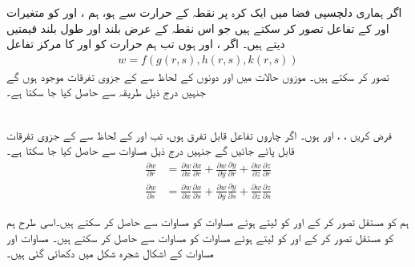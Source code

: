 اگر ہماری دلچسپی  فضا میں ایک کرہ  پر نقطہ   کے  حرارت سے ہو، ہم  ،  اور  کو  متغیرات  اور  کے تفاعل تصور کر سکتے ہیں جو  اس نقطہ کے عرض بلند اور  طول بلند قیمتیں دیتے ہیں۔ اگر ،  اور  ہوں  تب ہم حرارت کو  اور  کا  مرکز تفاعل
\begin{align*}
w=f(g(r,s),h(r,s),k(r,s))
\end{align*}
 تصور کر سکتے ہیں۔ موزوں حالات میں   اور  دونوں کے لحاظ سے  کے جزوی تفرقات موجود ہوں گے جنہیں درج ذیل طریقہ سے حاصل کیا جا سکتا ہے۔

\\
فرض کریں ، ،  اور  ہوں۔ اگر چاروں تفاعل قابل تفرق ہوں، تب  اور  کے لحاظ سے  کے جزوی تفرقات قابل  پائے جائیں گے جنہیں درج ذیل مساوات سے حاصل کیا جا سکتا ہے۔
\begin{align}
\frac{\partial w}{\partial r}&=\frac{\partial w}{\partial x}\frac{\partial x}{\partial r}+\frac{\partial w}{\partial y}\frac{\partial y}{\partial r}+\frac{\partial w}{\partial z}\frac{\partial z}{\partial r}\label{مساوات_کثیرالمتغیر_دو_غیر_تابع_تین_درمیانے_متغیر_الف}\\
\frac{\partial w}{\partial s}&=\frac{\partial w}{\partial x}\frac{\partial x}{\partial s}+\frac{\partial w}{\partial y}\frac{\partial y}{\partial s}+\frac{\partial w}{\partial z}\frac{\partial z}{\partial s}\label{مساوات_کثیرالمتغیر_دو_غیر_تابع_تین_درمیانے_متغیر_ب}
\end{align}

 ہم  کو مستقل  تصور کر کے  اور   کو لیتے  ہوئے مساوات  کو   مساوات  سے   حاصل کر سکتے ہیں۔اسی طرح   ہم  کو مستقل  تصور کر کے  اور   کو لیتے  ہوئے مساوات  کو   مساوات  سے   حاصل کر سکتے ہیں۔ مساوات  اور مساوات  کے اشکال شجرہ  شکل  میں دکھائی گئی ہیں۔

